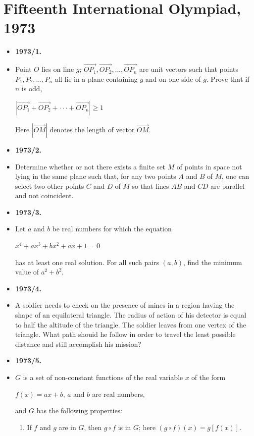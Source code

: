 \documentclass[a4paper,12pt]{article}
\begin{document}
\section*{\textbf{\Large Fifteenth International Olympiad, 1973}}
\begin{itemize}[label={},leftmargin=0pt]
\item \textbf{\large 1973/1.}
\item Point $O$ lies on line $g$; $\vec{OP_1}, \vec{OP_2}, ..., \vec{OP_n}$ are unit vectors such that points $P_1, P_2, ..., P_n$ all lie in a plane containing $g$ and on one side of $g$. Prove that if $n$ is odd,
	\begin{center}
		$|\vec{OP_1} +\vec{OP_2} + \cdot \cdot \cdot + \vec{OP_n}| \geq 1$
	\end{center}
		Here $|\vec{OM}|$ denotes the length of vector $\vec{OM}$.
\item \textbf{\large 1973/2.}
\item Determine whether or not there exists a finite set $M$ of points in space not lying in the same plane such that, for any two points $A$ and $B$ of $M$, one can select two other points $C$ and $D$ of $M$ so that lines $AB$ and $CD$ are parallel and not coincident.
\item \textbf{\large 1973/3.}
\item Let $a$ and $b$ be real numbers for which the equation
	\begin{center}
		$x^4 + ax^3 + bx^2 + ax + 1 = 0$
	\end{center}
has at least one real solution. For all such pairs $(a, b)$, find the minimum value of $a^2 + b^2$.
\item \textbf{\large 1973/4.}
\item A soldier needs to check on the presence of mines in a region having the shape of an equilateral triangle. The radius of action of his detector is equal to half the altitude of the triangle. The soldier leaves from one vertex of the triangle. What path shouid he follow in order to travel the least possible distance and still accomplish his mission?
\item \textbf{\large 1973/5.}
\item $G$ is a set of non-constant functions of the real variable $x$ of the form
	\begin{center}
		$f(x) = ax + b$, $a$ and $b$ are real numbers,
	\end{center}
and $G$ has the following properties:
\begin{enumerate}[label=(\alph*)]
	\item If $f$ and $g$ are in $G$, then $g \circ f$ is in $G$; here $(g \circ f)(x) = g[f(x)]$.

\end{enumerate}
\end{itemize}
\end{document}

